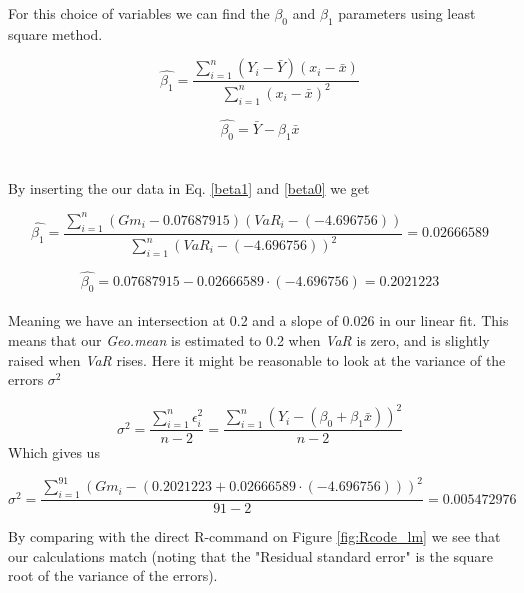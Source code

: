 \documentclass{article}
\begin{document}
For this choice of variables we can find the $\beta_0$ and $\beta_1$ parameters using least square method. 

\begin{equation}\label{beta1}
\hat{\beta_1}=
    \frac
        {\sum_{i=1}^n\left(Y_i-\bar{Y}\right)\left(x_i-\bar{x}\right)}
        {\sum_{i=1}^n\left(x_i-\bar{x}\right)^2}
\end{equation}

\begin{equation}\label{beta0}
\hat{\beta_0}=
    \bar{Y}-\beta_1 \bar{x}
\end{equation} \\
\\

By inserting the our data in Eq. \ref{beta1} and \ref{beta0} we get

\begin{equation}\label{beta1}
\hat{\beta_1}=
    \frac
        {\sum_{i=1}^n\left(Gm_i-0.07687915\right)\left(VaR_i-(-4.696756)\right)}
        {\sum_{i=1}^n\left(VaR_i-(-4.696756)\right)^2}
        =0.02666589
\end{equation}

\begin{equation}\label{beta0}
\hat{\beta_0}=
    0.07687915-0.02666589 \cdot (-4.696756)
    =0.2021223
\end{equation}
\\

Meaning we have an intersection at 0.2 and a slope of 0.026 in our linear fit. This means that our \textit{Geo.mean} is estimated to 0.2 when \textit{VaR} is zero, and is slightly raised when \textit{VaR} rises. Here it might be reasonable to look at the variance of the errors $\sigma^2$

\begin{equation}
\sigma^2=
    \frac
        {\sum_{i=1}^n \epsilon_i^2}
        {n-2} 
    =
    \frac
        {\sum_{i=1}^n \left(Y_i-\left(\beta_0+\beta_1 \bar{x}\right)\right)^2}
        {n-2}
\end{equation}
Which gives us 

\begin{equation}
\sigma^2=
    \frac
        {\sum_{i=1}^{91} \left(Gm_i-\left(0.2021223 +0.02666589 
        \cdot( -4.696756)\right)\right)^2}
        {91-2}=0.005472976
\end{equation}

By comparing with the direct R-command on Figure \ref{fig:Rcode_lm} we see that our calculations match (noting that the "Residual standard error" is the square root of the variance of the errors). 
\end{document}
